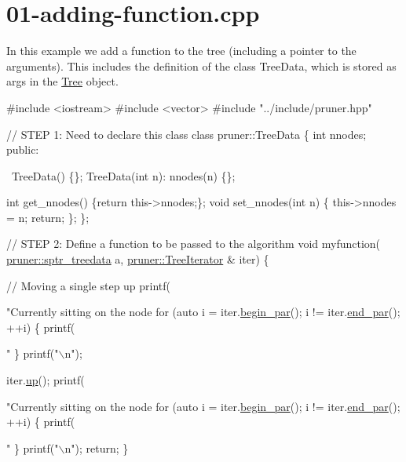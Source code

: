 \hypertarget{01-adding-function_8cpp-example}{}\section{01-\/adding-\/function.\+cpp}
In this example we add a function to the tree (including a pointer to the arguments). This includes the definition of the class Tree\+Data, which is stored as args in the \hyperlink{classTree}{Tree} object.


\begin{DoxyCodeInclude}
\textcolor{preprocessor}{#include <iostream>}
\textcolor{preprocessor}{#include <vector>}
\textcolor{preprocessor}{#include "../include/pruner.hpp"}

\textcolor{comment}{// STEP 1: Need to declare this class}
\textcolor{keyword}{class }pruner::TreeData \{
  \textcolor{keywordtype}{int} nnodes;
\textcolor{keyword}{public}:
  
  ~TreeData() \{\};
  TreeData(\textcolor{keywordtype}{int} n): nnodes(n) \{\};
  
  \textcolor{keywordtype}{int} get\_nnodes() \{\textcolor{keywordflow}{return} this->nnodes;\};
  \textcolor{keywordtype}{void} set\_nnodes(\textcolor{keywordtype}{int} n) \{
    this->nnodes = n;
    \textcolor{keywordflow}{return};
  \};
\};

\textcolor{comment}{// STEP 2: Define a function to be passed to the algorithm}
\textcolor{keywordtype}{void} myfunction(
    \hyperlink{namespacepruner_a533476fef17527e75c4fba71d8c4ce50}{pruner::sptr\_treedata} a,
    \hyperlink{classpruner_1_1TreeIterator}{pruner::TreeIterator} & iter) \{
  
  \textcolor{comment}{// Moving a single step up}
  printf(\textcolor{stringliteral}{"Currently sitting on the node %
  \textcolor{keywordflow}{for} (\textcolor{keyword}{auto} i = iter.\hyperlink{classpruner_1_1TreeIterator_a3cb8dd28630f065472e135f7db822abf}{begin\_par}(); i != iter.\hyperlink{classpruner_1_1TreeIterator_aac5656fc5b550cb8dfa4a9ebd5ea910a}{end\_par}(); ++i) \{
    printf(\textcolor{stringliteral}{" %
  \}
  printf(\textcolor{stringliteral}{"\(\backslash\)n"});
  
  iter.\hyperlink{classpruner_1_1TreeIterator_adca1d999f093a69e2f5d044b358e5da7}{up}();
  printf(\textcolor{stringliteral}{"Currently sitting on the node %
  \textcolor{keywordflow}{for} (\textcolor{keyword}{auto} i = iter.\hyperlink{classpruner_1_1TreeIterator_a3cb8dd28630f065472e135f7db822abf}{begin\_par}(); i != iter.\hyperlink{classpruner_1_1TreeIterator_aac5656fc5b550cb8dfa4a9ebd5ea910a}{end\_par}(); ++i) \{
    printf(\textcolor{stringliteral}{" %
  \}
  printf(\textcolor{stringliteral}{"\(\backslash\)n"});
  \textcolor{keywordflow}{return};
\}

}}}}
\end{DoxyCodeInclude}
